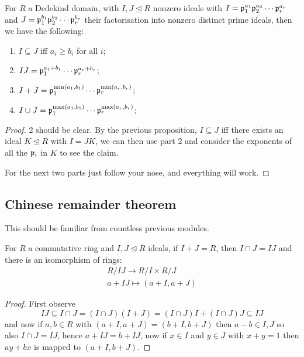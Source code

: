 \documentclass{article}
\begin{document}
\begin{proposition}
    For $R$ a Dedekind domain, with $I,J\unlhd R$ nonzero ideals with $I=\mathfrak{p}_1^{a_1}\mathfrak{p}_2^{a_2}\cdots \mathfrak{p}_r^{a_r}$ and $J=\mathfrak{p}_1^{b_1}\mathfrak{p}_2^{b_2}\cdots \mathfrak{p}_r^{b_r}$ their factorisation into nonzero distinct prime ideals, then we have the following: \begin{enumerate}
        \item $I\subseteq J$ iff $a_i\geq b_i$ for all $i$;
        \item $IJ=\mathfrak{p}_1^{a_1+b_1}\cdots \mathfrak{p}_r^{a_r+b_r}$;
        \item $I+J=\mathfrak{p}_1^{\min(a_1,b_1)}\cdots \mathfrak{p}_r^{\min(a_r,b_r)}$;
        \item $I\cup J=\mathfrak{p}_1^{\max(a_1,b_1)}\cdots \mathfrak{p}_r^{\max(a_r,b_r)}$;
    \end{enumerate}
    \begin{proof}
        2 should be clear. By the previous proposition, $I\subseteq J$ iff there exists an ideal $K\unlhd R$ with $I=JK$, we can then use part 2 and consider the exponents of all the $\mathfrak{p}_i$ in $K$ to see the claim.

        For the next two parts just follow your nose, and everything will work.
    \end{proof}
\end{proposition}

\subsection{Chinese remainder theorem}

This should be familiar from countless previous modules.

\begin{proposition}[CRT]
    For $R$ a commutative ring and $I,J\unlhd R$ ideals, if $I+J=R$, then $I\cap J=IJ$ and there is an isomorphism of rings:\vspace{-12pt} \begin{gather*}
        R/IJ \rightarrow R/I\times R/J\\
        a + IJ \mapsto (a+I, a+J)
    \end{gather*}
    \begin{proof}
        First observe \vspace{-12pt}\[
        IJ \subseteq I\cap J =  (I\cap J)(I+J) = (I\cap J)I + (I\cap J)J \subseteq IJ
        \] and now if $a,b\in R$ with $(a+I,a+J)=(b+I,b+J)$ then $a-b\in I,J$ so also $I\cap J=IJ$, hence $a+IJ=b+IJ$, now if $x\in I$ and $y\in J$ with $x+y=1$ then $ay+bx$ is mapped to $(a+I,b+J)$.
    \end{proof}
\end{proposition}
\end{document}
